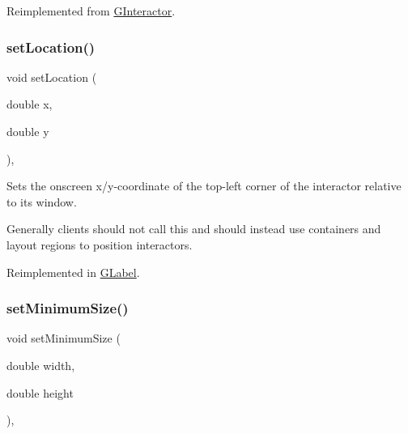Reimplemented from \mbox{\hyperlink{classGInteractor_a762e139aa311461c3984d3ad28293f64}{G\+Interactor}}.

\mbox{\label{classGInteractor_a04594e8ba9b98513a64f1da00dcae18c}} 
\subsubsection{\texorpdfstring{set\+Location()}{setLocation()}}
{\footnotesize\ttfamily void set\+Location (\begin{DoxyParamCaption}\item[{double}]{x,  }\item[{double}]{y }\end{DoxyParamCaption})\hspace{0.3cm}{\ttfamily [virtual]}, {\ttfamily [inherited]}}



Sets the onscreen x/y-\/coordinate of the top-\/left corner of the interactor relative to its window. 

Generally clients should not call this and should instead use containers and layout regions to position interactors. 

Reimplemented in \mbox{\hyperlink{classGLabel_a40e39a7bf1b0b46b3a5710bb9a0d214b}{G\+Label}}.

\mbox{\label{classGInteractor_a0cf428e207b7f22cc08138a90b1b87b2}} 
\subsubsection{\texorpdfstring{set\+Minimum\+Size()}{setMinimumSize()}\hspace{0.1cm}{\footnotesize\ttfamily [1/2]}}
{\footnotesize\ttfamily void set\+Minimum\+Size (\begin{DoxyParamCaption}\item[{double}]{width,  }\item[{double}]{height }\end{DoxyParamCaption})\hspace{0.3cm}{\ttfamily [virtual]}, {\ttfamily [inherited]}}



